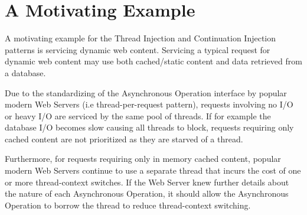 \documentclass[prodmode]{style/acmlarge}
\begin{document}
\begin{table}[t]
\label{tab:ProactorParticipants}
\end{table}



\section{A Motivating Example}

A motivating example for the Thread Injection and Continuation Injection
patterns is servicing dynamic web content.  Servicing a typical request for
dynamic web content may use both cached/static content and data retrieved from a
database.

Due to the standardizing of the Asynchronous Operation interface by popular
modern Web Servers (i.e thread-per-request pattern), requests involving no I/O
or heavy I/O are serviced by the same pool of threads.  If for example the
database I/O becomes slow causing all threads to block, requests requiring only
cached content are not prioritized as they are starved of a thread.

Furthermore, for requests requiring only in memory cached content, popular
modern Web Servers continue to use a separate thread that incurs the cost of one
or more thread-context switches.  If the Web Server knew further details about
the nature of each Asynchronous Operation, it should allow the Asynchronous
Operation to borrow the thread to reduce thread-context switching.
\end{document}

